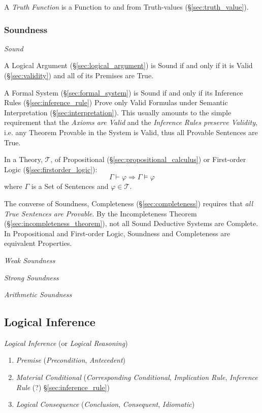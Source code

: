 A \emph{Truth Function} is a Function to and from Truth-values
(\S\ref{sec:truth_value}).



\subsubsection{Soundness}\label{sec:soundness}

\emph{Sound}

A Logical Argument (\S\ref{sec:logical_argument}) is Sound if and only
if it is Valid (\S\ref{sec:validity}) and all of its Premises are
True.

A Formal System (\S\ref{sec:formal_system}) is Sound if and only if its
Inference Rules (\S\ref{sec:inference_rule}) Prove only Valid Formulas under
Semantic Interpretation (\S\ref{sec:interpretation}). This usually amounts to
the simple requirement that the \emph{Axioms are Valid} and the \emph{Inference
  Rules preserve Validity}, i.e. any Theorem Provable in the System is Valid,
thus all Provable Sentences are True.

In a Theory, $\mathcal{T}$, of Propositional
(\S\ref{sec:propositional_calculus}) or First-order Logic
(\S\ref{sec:firstorder_logic}):
\[
  \Gamma \vdash \varphi \Rightarrow \Gamma \vDash \varphi
\]
where $\Gamma$ is a Set of Sentences and $\varphi \in \mathcal{T}$.

The converse of Soundness, Completeness (\S\ref{sec:completeness}) requires
that \emph{all True Sentences are Provable}. By the Incompleteness Theorem
(\S\ref{sec:incompleteness_theorem}), not all Sound Deductive Systems are
Complete. In Propositional and First-order Logic, Soundness and Completeness
are equivalent Properties.

\emph{Weak Soundness}

\emph{Strong Soundness}

\emph{Arithmetic Soundness}



\subsection{Logical Inference}\label{sec:logical_inference}

\emph{Logical Inference} (or \emph{Logical Reasoning})

\begin{enumerate}
\item \emph{Premise} (\emph{Precondition}, \emph{Antecedent})

\item \emph{Material Conditional} (\emph{Corresponding Conditional},
  \emph{Implication Rule}, \emph{Inference Rule} (?)
  \S\ref{sec:inference_rule})

\item \emph{Logical Consequence} (\emph{Conclusion},
  \emph{Consequent}, \emph{Idiomatic})
\end{enumerate}

